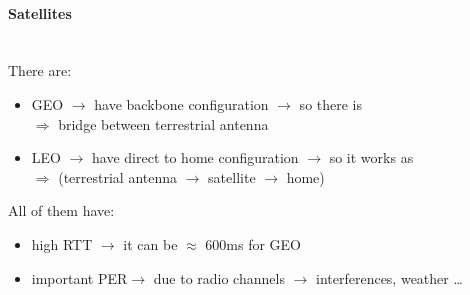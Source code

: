 \paragraph{Satellites}\mbox{}\\[0.2cm]
There are:
\begin{itemize}
    \item GEO $\rightarrow$ have backbone configuration $\rightarrow$ so there is\\
    $\Rightarrow$ bridge between terrestrial antenna
    \item LEO $\rightarrow$ have direct to home configuration $\rightarrow$ so it works as\\
    $\Rightarrow$ (terrestrial antenna $\rightarrow$ satellite $\rightarrow$ home)
\end{itemize}
All of them have:
\begin{itemize}
    \item high RTT $\rightarrow$ it can be $\approx$ 600ms for GEO
    \item important PER\footPER $\rightarrow$ due to radio channels $\rightarrow$
    interferences, weather \dots
\end{itemize}

